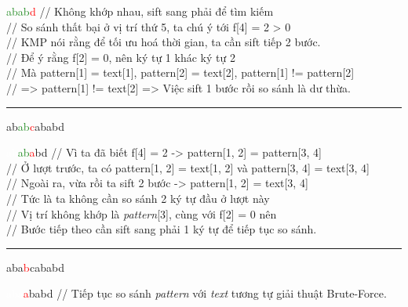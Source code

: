 \documentclass[a4paper,11pt]{article}
\begin{document}
			\textcolor{ForestGreen}{abab}\textcolor{red}{d}			\hspace*{1.2cm} // Không khớp nhau, sift sang phải để tìm kiếm \\
																	\hspace*{2.9cm} // So sánh thất bại ở vị trí thứ 5, ta chú ý tới f[4] = 2 > 0 \\
																	\hspace*{2.9cm} // KMP nói rằng để tối ưu hoá thời gian, ta cần sift tiếp 2 bước.\\
																	\hspace*{2.9cm} // Để ý rằng f[2] = 0, nên ký tự 1 khác ký tự 2 \\  
																	\hspace*{2.9cm} // Mà pattern[1] = text[1], pattern[2] = text[2], pattern[1] != pattern[2] \\ 
																	\hspace*{2.9cm} // => pattern[1] != text[2] => Việc sift 1 bước rồi so sánh là dư thừa.

			\vspace*{2mm}
			\hrule
			ab\textcolor{ForestGreen}{ab}\textcolor{red}{c}ababd
			
			\textcolor{white}{ab}\textcolor{ForestGreen}{ab}\textcolor{red}{a}bd 			\hspace*{0.8cm} // Vì ta đã biết f[4] = 2 -> pattern[1, 2] = pattern[3, 4] \\
																							\hspace*{2.9cm} // Ở lượt trước, ta có pattern[1, 2] = text[1, 2] và pattern[3, 4] = text[3, 4] \\
																							\hspace*{2.9cm} // Ngoài ra, vừa rồi ta sift 2 bước -> pattern[1, 2] = text[3, 4]\\
																							\hspace*{2.9cm} // Tức là ta không cần so sánh 2 ký tự đầu ở lượt này\\
																							\hspace*{2.9cm} // Vị trí không khớp là \textit{pattern}[3], cùng với f[2] = 0 nên \\
																							\hspace*{2.9cm} // Bước tiếp theo cần sift sang phải 1 ký tự để tiếp tục so sánh.

			\vspace*{2mm}
			\hrule
			aba\textcolor{red}{b}cababd
			
			\textcolor{white}{aba}\textcolor{red}{a}babd 						\hspace*{1.2cm} // Tiếp tục so sánh \textit{pattern} với \textit{text} tương tự giải thuật Brute-Force. 
\end{document}
